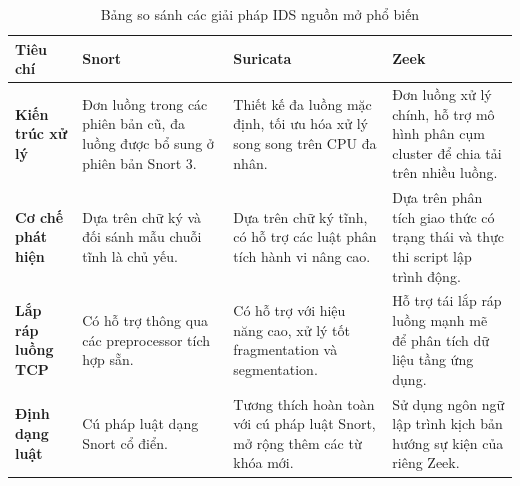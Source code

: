 \begin{table}[H]
    \centering
    \scriptsize
    \renewcommand{\arraystretch}{1.4}
    \begin{tabular}{|m{2.5cm}|m{4.0cm}|m{4.0cm}|m{4.0cm}|}
        \hline
        \textbf{Tiêu chí} & \textbf{Snort} & \textbf{Suricata} & \textbf{Zeek} \\ \hline
        \textbf{Kiến trúc xử lý} & Đơn luồng trong các phiên bản cũ, đa luồng được bổ sung ở phiên bản Snort 3. & Thiết kế đa luồng mặc định, tối ưu hóa xử lý song song trên CPU đa nhân. & Đơn luồng xử lý chính, hỗ trợ mô hình phân cụm cluster để chia tải trên nhiều luồng. \\ \hline
        \textbf{Cơ chế phát hiện} & Dựa trên chữ ký và đối sánh mẫu chuỗi tĩnh là chủ yếu. & Dựa trên chữ ký tĩnh, có hỗ trợ các luật phân tích hành vi nâng cao. & Dựa trên phân tích giao thức có trạng thái và thực thi script lập trình động. \\ \hline
        \textbf{Lắp ráp luồng TCP} & Có hỗ trợ thông qua các preprocessor tích hợp sẵn. & Có hỗ trợ với hiệu năng cao, xử lý tốt fragmentation và segmentation. & Hỗ trợ tái lắp ráp luồng mạnh mẽ để phân tích dữ liệu tầng ứng dụng. \\ \hline
        \textbf{Định dạng luật} & Cú pháp luật dạng Snort cổ điển. & Tương thích hoàn toàn với cú pháp luật Snort, mở rộng thêm các từ khóa mới. & Sử dụng ngôn ngữ lập trình kịch bản hướng sự kiện của riêng Zeek. \\ \hline
    \end{tabular}
    \caption{Bảng so sánh các giải pháp IDS nguồn mở phổ biến}
    \label{tab:ids_comparison}
\end{table}
